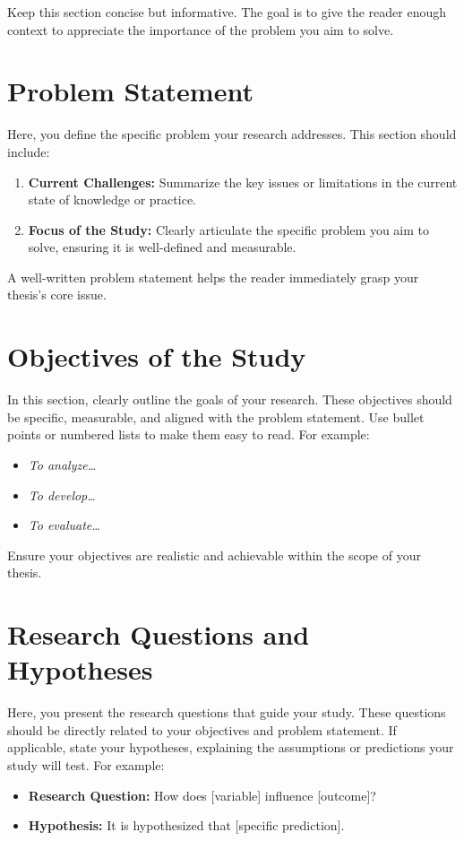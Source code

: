 Keep this section concise but informative. The goal is to give the reader enough context to appreciate the importance of the problem you aim to solve.

\section{Problem Statement}\label{sec:problem-statement}
Here, you define the specific problem your research addresses. This section should include:
\begin{enumerate}
	\item \textbf{Current Challenges:} Summarize the key issues or limitations in the current state of knowledge or practice.
    \item \textbf{Focus of the Study:} Clearly articulate the specific problem you aim to solve, ensuring it is well-defined and measurable.
\end{enumerate}

A well-written problem statement helps the reader immediately grasp your thesis's core issue.

\section{Objectives of the Study}\label{sec:objectives}
In this section, clearly outline the goals of your research. These objectives should be specific, measurable, and aligned with the problem statement. Use bullet points or numbered lists to make them easy to read. For example:
\begin{itemize}
	\item \textit{To analyze\dots}
    \item \textit{To develop\dots}
    \item \textit{To evaluate\dots}
\end{itemize}

Ensure your objectives are realistic and achievable within the scope of your thesis.

\section{Research Questions and Hypotheses}\label{sec:research-questions}
Here, you present the research questions that guide your study. These questions should be directly related to your objectives and problem statement. If applicable, state your hypotheses, explaining the assumptions or predictions your study will test. For example:
\begin{itemize}
	\item \textbf{Research Question:} How does [variable] influence [outcome]?
    \item \textbf{Hypothesis:} It is hypothesized that [specific prediction].
\end{itemize}

